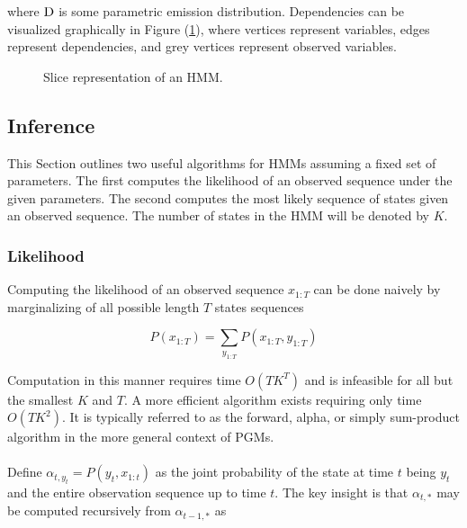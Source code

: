\documentclass[12pt]{report}
\newcommand{\1}[0]{\mathbbm{1}}
\newcommand{\SomeDist}[0]{\textnormal{D}}
\newcommand{\seq}[3]{\ensuremath{#1_{{#2}:{#3}}}}
\begin{document}
where $\SomeDist$ is some parametric emission distribution.
Dependencies can be visualized graphically in Figure (\ref{fig:hmm}), 
where vertices represent variables, edges represent dependencies, 
and grey vertices represent observed variables.

\begin{figure}[ht!]
    \centering
    \caption{Slice representation of an \ac{HMM}.}
    \label{fig:hmm}
\end{figure}

\subsection{Inference}
This Section outlines two useful algorithms for \acp{HMM} 
assuming a fixed set of parameters. The first computes the 
likelihood of an observed sequence under the given parameters. 
The second computes the most likely sequence of states given
an observed sequence. The number of states in the \ac{HMM} will
be denoted by $K$.

\subsubsection{Likelihood}
Computing the likelihood of an observed sequence $\seq{x}{1}{T}$ can be done naively
by marginalizing of all possible length $T$ states sequences

\[
    P(\seq{x}{1}{T}) = \sum_{\seq{y}{1}{T}} P(\seq{x}{1}{T}, \seq{y}{1}{T})
\]

Computation in this manner requires time $O(TK^T)$ and is infeasible for all
but the smallest $K$ and $T$. A more efficient algorithm exists requiring only time
$O(TK^2)$. It is typically referred to as the forward, alpha, or 
simply sum-product algorithm in the more general context of \acp{PGM}.
\\\\
Define $\alpha_{t,y_t} = P(y_t, \seq{x}{1}{t})$ as the joint probability
of the state at time $t$ being $y_t$ and the entire observation sequence up to
time $t$. The key insight is that $\alpha_{t,*}$ may be computed recursively 
from $\alpha_{t-1,*}$ as
\end{document}
